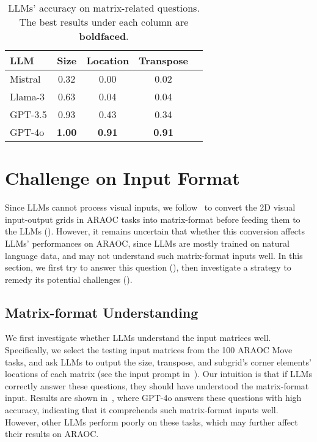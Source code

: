 \begin{table}[tb]
\small
\centering
\setlength{\tabcolsep}{3mm}
\begin{tabular}{lcccc}
\toprule
\textbf{LLM} &\textbf{Size} & \textbf{Location} & \textbf{Transpose} %
\\
\midrule
Mistral &0.32 &0.00 &0.02 %
\\
Llama-3 & 0.63&0.04 &0.04 %
\\
\midrule
GPT-3.5 &0.93 &0.43 &0.34 %
\\
GPT-4o &\textbf{1.00} &\textbf{0.91} &\textbf{0.91} \\
\bottomrule
\end{tabular}
\caption{LLMs' accuracy on matrix-related questions. The best results under each column are \textbf{boldfaced}.}
\vspace{-0.1in}
\label{tab:understand matrix}
\end{table}

\section{Challenge on Input Format}
\label{sec:matrix}



Since LLMs cannot process visual inputs, we follow~\citet{wang2023hypothesis} to convert the 2D visual input-output grids in ARAOC tasks into matrix-format before feeding them to the LLMs (). However, it remains uncertain that whether this conversion affects LLMs' performances on ARAOC, since LLMs are mostly trained on natural language data, and may not understand such matrix-format inputs well. In this section, we first try to answer this question (), then investigate a strategy to remedy its potential challenges ().


\subsection{Matrix-format Understanding}
\label{sec:understand matrix}
We first investigate whether LLMs understand the input matrices well. Specifically, we select the testing input matrices from the 100 ARAOC Move tasks, and ask LLMs to output the size, transpose, and subgrid's corner elements' locations of each matrix (see the input prompt in~). Our intuition is that if LLMs correctly answer these questions, they should have understood the matrix-format input. %
Results are shown in~, where GPT-4o answers these questions with high accuracy, indicating that it comprehends such matrix-format inputs well. However, other LLMs perform poorly on these tasks, which may further affect their results on ARAOC. 



